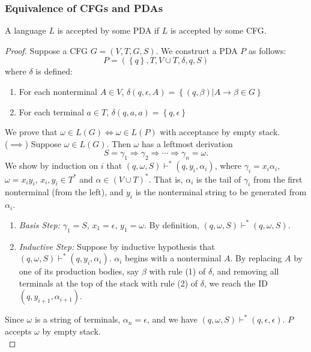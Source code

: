 \subsubsection{Equivalence of CFGs and PDAs}
\begin{theorem}
  A language $L$ is accepted by some PDA if $L$ is accepted by some CFG\@.
\end{theorem}
\begin{proof}
  Suppose a CFG $G=\left( V,T,G,S \right) $. We construct a PDA $P$ as follows: 
  \[P=\left( \left\{ q \right\} ,T,V\cup T,\delta,q,S \right)\]
  where $\delta$ is defined:
  \begin{enumerate}
    \item For each nonterminal $A\in V$, $\delta\left( q,\epsilon,A \right)
      =\left\{ \left( q,\beta \right) | A\to \beta\in G \right\}$
    \item For each terminal $a\in T$, $\delta\left( q,a,a \right) =\left\{ q,\epsilon \right\} $
  \end{enumerate}
  We prove that $\omega\in L(G)\iff \omega\in L(P)$ with
  acceptance by empty stack.\\

  ($\implies$) Suppose $\omega\in L(G)$. Then $\omega$ has a leftmost derivation
  \[S = \gamma_1 \Rightarrow \gamma_2 \Rightarrow \cdots \Rightarrow \gamma_{n}=\omega.\] 
  We show by induction on $i$ that $\left( q,\omega,S \right) \vdash^{*} \left(
  q,y_i,\alpha_i \right) $, where $\gamma_i=x_i\alpha_i$, $\omega=x_i y_i$,
  $x_i,y_i\in T^{*}$ and $\alpha\in \left( V\cup T \right) ^{*}$. That is,
  $\alpha_i$ is the tail of $\gamma_i$ from the first nonterminal (from the
  left), and $y_i$ is the nonterminal string to be generated from $\alpha_i$.
  \begin{enumerate}
    \item \textit{Basis Step:} $\gamma_1=S$, $x_1=\epsilon$, $y_1=\omega$. By definition,
      $\left( q,\omega,S \right) \vdash^{*}\left( q,\omega,S \right) $.
    \item \textit{Inductive Step:} Suppose by inductive hypothesis that $\left(
      q,\omega,S \right) \vdash^{*}\left( q,y_i,\alpha_i \right) $. $\alpha_i$
      begins with a nonterminal $A$. By replacing $A$ by one of its production
      bodies, say $\beta$ with rule (1) of $\delta$, and removing all terminals at the
      top of the stack with rule (2) of $\delta$, we reach the ID $\left(
      q,y_{i+1},\alpha_{i+1} \right) $.
  \end{enumerate}
  Since $\omega$ is a string of terminals, $\alpha_{n}=\epsilon$, and we have
  $\left( q,\omega,S \right) \vdash^{*}\left( q,\epsilon,\epsilon \right) $.
  $P$ accepts $\omega$ by empty stack.\\


\end{proof}
